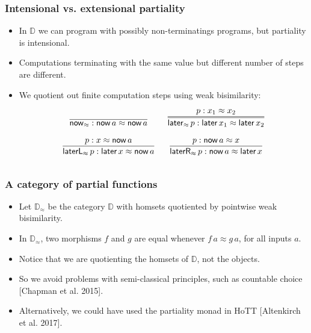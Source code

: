 \documentclass[12pt,t]{beamer}
\newcommand{\now}{\mathsf{now}}
\newcommand{\later}{\mathsf{later}}
\newcommand{\laterR}{\mathsf{laterR}}
\newcommand{\laterL}{\mathsf{laterL}}
\newcommand{\D}{\mathbb{D}}
\newcommand{\Dapprox}{\mathbb{D}_{\approx}}
\begin{document}
\begin{frame}

  \frametitle{Intensional vs. extensional partiality}
  \begin{itemize}
  \item In $\D$ we can program with possibly non-terminatings
    programs, but partiality is intensional.
  \item Computations terminating with the same value but 
    different number of steps are different.
  \item We quotient out finite computation steps using weak
    bisimilarity:
    \[
      \arraycolsep=8pt\def\arraystretch{2.8}
      \begin{array}{cc}
        \infer{\now_{\approx}  : \now\,a \approx \now\,a}{}
        &
        \infer={\later_{\approx} \,p : \later\,x_1 \approx \later\,x_2}{p : x_1 \approx x_2}
        \\
        \infer{\laterL_{\approx} \, p: \later\,x \approx \now\,a}{p : x \approx \now \,a}
        &
        \infer{\laterR_{\approx} \, p: \now\,a \approx \later\,x}{p : \now\,a \approx x}
      \end{array}
    \]
    
  \end{itemize}
  
  
\end{frame}

\begin{frame}

  \frametitle{A category of partial functions}
  \begin{itemize}
    \item Let $\Dapprox$ be the category $\D$ with homsets
      quotiented by pointwise weak bisimilarity.
    \item In $\Dapprox$, two morphisms $f$ and $g$ are equal whenever
      $f \, a \approx g \, a$, for all inputs $a$.
      \pause
      \vspace{\fill}
    \item Notice that we are quotienting the homsets of $\D$, not the objects.
    \item So we avoid problems with semi-classical principles, such as countable choice [Chapman et al. 2015].
    \item Alternatively, we could have used the partiality monad in
      HoTT [Altenkirch et al. 2017].

  \end{itemize}
  
  
\end{frame}
\end{document}
